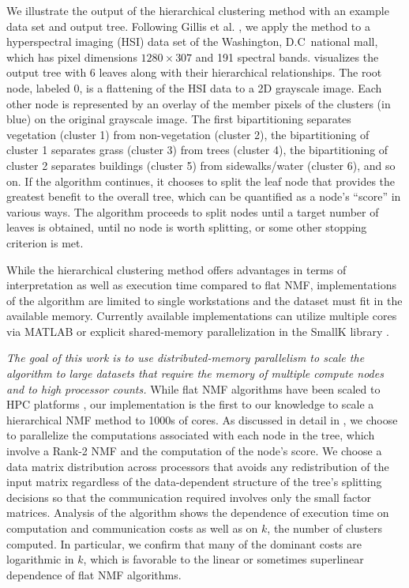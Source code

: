 We illustrate the output of the hierarchical clustering method with an example data set and output tree.
Following Gillis et al. \cite{GKP15}, we apply the method to a hyperspectral imaging (HSI) data set of the Washington, D.C~national mall, which has pixel dimensions $1280 \times 307$ and 191 spectral bands.
 visualizes the output tree with 6 leaves along with their hierarchical relationships.
The root node, labeled 0, is a flattening of the HSI data to a 2D grayscale image.
Each other node is represented by an overlay of the member pixels of the clusters (in blue) on the original grayscale image.
The first bipartitioning separates vegetation (cluster 1) from non-vegetation (cluster 2), the bipartitioning of cluster 1 separates grass (cluster 3) from trees (cluster 4), the bipartitioning of cluster 2 separates buildings (cluster 5) from sidewalks/water (cluster 6), and so on.
If the algorithm continues, it chooses to split the leaf node that provides the greatest benefit to the overall tree, which can be quantified as a node's ``score'' in various ways.
The algorithm proceeds to split nodes until a target number of leaves is obtained, until no node is worth splitting, or some other stopping criterion is met.

While the hierarchical clustering method offers advantages in terms of interpretation as well as execution time compared to flat NMF, implementations of the algorithm are limited to single workstations and the dataset must fit in the available memory.
Currently available implementations can utilize multiple cores via MATLAB \cite{KP13} or explicit shared-memory parallelization in the SmallK library \cite{SmallK}.

{\em The goal of this work is to use distributed-memory parallelism to scale the algorithm to large datasets that require the memory of multiple compute nodes and to high processor counts.}
While flat NMF algorithms have been scaled to HPC platforms \cite{FKPB15,BW09,MESPS20,KBP17}, our implementation is the first to our knowledge to scale a hierarchical NMF method to 1000s of cores. 
As discussed in detail in , we choose to parallelize the computations associated with each node in the tree, which involve a Rank-2 NMF and the computation of the node's score.
We choose a data matrix distribution across processors that avoids any redistribution of the input matrix regardless of the data-dependent structure of the tree's splitting decisions so that the communication required involves only the small factor matrices.
Analysis of the algorithm shows the dependence of execution time on computation and communication costs as well as on $k$, the number of clusters computed.
In particular, we confirm that many of the dominant costs are logarithmic in $k$, which is favorable to the linear or sometimes superlinear dependence of flat NMF algorithms.

